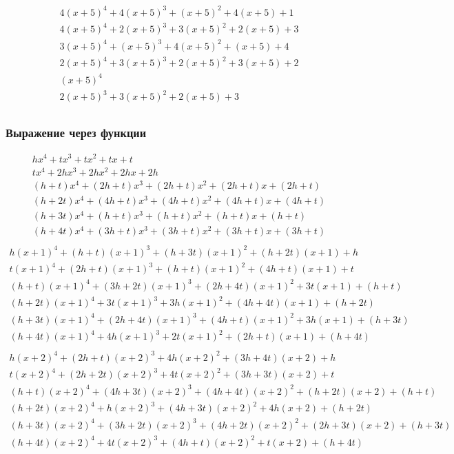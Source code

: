 \documentclass[bibliography=totoc, a4paper, 12pt]{extarticle}
\begin{document}
$$\begin{array}{l}
4(x+5)^4 + 4(x+5)^3 + (x+5)^2 + 4(x+5) + 1\\
4(x+5)^4 + 2(x+5)^3 + 3(x+5)^2 + 2(x+5) + 3\\
3(x+5)^4 + (x+5)^3 + 4(x+5)^2 + (x+5) + 4\\
2(x+5)^4 + 3(x+5)^3 + 2(x+5)^2 + 3(x+5) + 2\\
(x+5)^4\\
2(x+5)^3 + 3(x+5)^2 + 2(x+5) + 3\\
\end{array}$$

\subsubsection{Выражение через функции}
$$\begin{array}{l}
hx^4 + tx^3 + tx^2 + tx + t\\
tx^4 + 2hx^3 + 2hx^2 + 2hx + 2h\\
(h + t)x^4 + (2h + t)x^3 + (2h + t)x^2 + (2h + t)x + (2h + t)\\
(h + 2t)x^4 + (4h + t)x^3 + (4h + t)x^2 + (4h + t)x + (4h + t)\\
(h + 3t)x^4 + (h + t)x^3 + (h + t)x^2 + (h + t)x + (h + t)\\
(h + 4t)x^4 + (3h + t)x^3 + (3h + t)x^2 + (3h + t)x + (3h + t)\\
\end{array}$$
$$\begin{array}{l}
h(x+1)^4 + (h + t)(x+1)^3 + (h + 3t)(x+1)^2 + (h + 2t)(x+1) + h\\
t(x+1)^4 + (2h + t)(x+1)^3 + (h + t)(x+1)^2 + (4h + t)(x+1) + t\\
(h + t)(x+1)^4 + (3h + 2t)(x+1)^3 + (2h + 4t)(x+1)^2 + 3t(x+1) + (h + t)\\
(h + 2t)(x+1)^4 + 3t(x+1)^3 + 3h(x+1)^2 + (4h + 4t)(x+1) + (h + 2t)\\
(h + 3t)(x+1)^4 + (2h + 4t)(x+1)^3 + (4h + t)(x+1)^2 + 3h(x+1) + (h + 3t)\\
(h + 4t)(x+1)^4 + 4h(x+1)^3 + 2t(x+1)^2 + (2h + t)(x+1) + (h + 4t)\\
\end{array}$$
$$\begin{array}{l}
h(x+2)^4 + (2h + t)(x+2)^3 + 4h(x+2)^2 + (3h + 4t)(x+2) + h\\
t(x+2)^4 + (2h + 2t)(x+2)^3 + 4t(x+2)^2 + (3h + 3t)(x+2) + t\\
(h + t)(x+2)^4 + (4h + 3t)(x+2)^3 + (4h + 4t)(x+2)^2 + (h + 2t)(x+2) + (h + t)\\
(h + 2t)(x+2)^4 + h(x+2)^3 + (4h + 3t)(x+2)^2 + 4h(x+2) + (h + 2t)\\
(h + 3t)(x+2)^4 + (3h + 2t)(x+2)^3 + (4h + 2t)(x+2)^2 + (2h + 3t)(x+2) +
(h + 3t)\\
(h + 4t)(x+2)^4 + 4t(x+2)^3 + (4h + t)(x+2)^2 + t(x+2) + (h + 4t)\\
\end{array}$$
\end{document}
